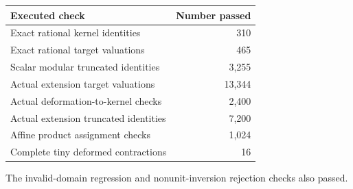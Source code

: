 \begin{center}
\begin{tabular}{@{}lr@{}}
\toprule
Executed check & Number passed\\
\midrule
Exact rational kernel identities & 310\\
Exact rational target valuations & 465\\
Scalar modular truncated identities & 3,255\\
Actual extension target valuations & 13,344\\
Actual deformation-to-kernel checks & 2,400\\
Actual extension truncated identities & 7,200\\
Affine product assignment checks & 1,024\\
Complete tiny deformed contractions & 16\\
\bottomrule
\end{tabular}
\end{center}
The invalid-domain regression and nonunit-inversion rejection checks also passed.
